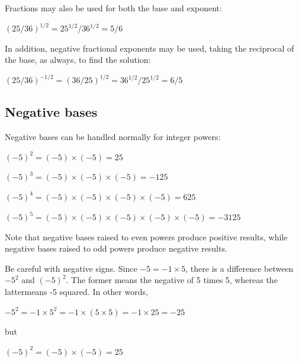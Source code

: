 Fractions may also be used for both the base and exponent:



$(25/36)^{1/2} = 25^{1/2}/36^{1/2} = 5/6 \;$



In addition, negative fractional exponents may be used, taking the reciprocal of the base,
as always, to find the solution:



$(25/36)^{-1/2} = (36/25)^{1/2} = 36^{1/2}/25^{1/2} = 6/5 \;$




\subsection{Negative bases}
\label{sss:nega-1d49}




Negative bases can be handled normally for integer powers:



$(-5)^2 = (-5) \times (-5) = 25 \;$



$(-5)^3 = (-5) \times (-5) \times (-5) = -125 \;$



$(-5)^4 = (-5) \times (-5) \times (-5) \times (-5) = 625 \;$



$(-5)^5 = (-5) \times (-5) \times (-5) \times (-5) \times (-5) = -3125 \;$



Note that negative bases raised to even powers produce positive results, while negative
bases raised to odd powers produce negative results.



Be careful with negative signs. Since $-5 = -1\times5$, there is a difference between $-5^2$ and
$(-5)^2$. The former means the negative of 5 times 5, whereas the lattermeans -5 squared.
In other words,



$-5^2 = -1\times5^2 = -1\times(5\times5) = -1\times25 = -25$



but



$(-5)^2=(-5)\times(-5)=25$



